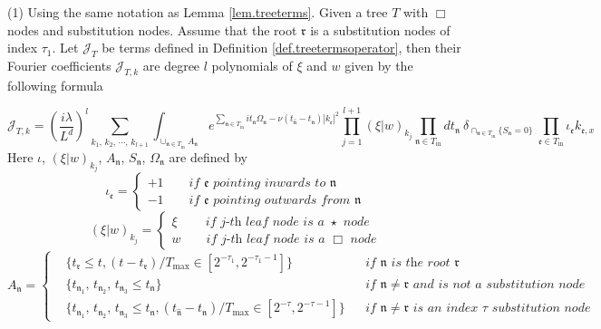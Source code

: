 \begin{lem}\label{lem.treetermsoperator} (1) Using the same notation as Lemma \ref{lem.treeterms}. Given a tree $T$ with $\Box$ nodes and substitution nodes. Assume that the root $\mathfrak{r}$ is a substitution nodes of index $\tau_{1}$. Let $\mathcal{J}_T$ be terms defined in Definition \ref{def.treetermsoperator}, then their Fourier coefficients $\mathcal{J}_{T,k}$ are degree $l$ polynomials of $\xi$ and $w$ given by the following formula

\begin{equation}\label{eq.coeftermoperator.threewave}
\mathcal{J}_{T,k}=\left(\frac{i\lambda}{L^{d}}\right)^l\sum_{k_1,\, k_2,\, \cdots,\, k_{l+1}} \int_{\cup_{\mathfrak{n}\in T_{\text{in}}} A_{\mathfrak{n}}} e^{\sum_{\mathfrak{n}\in T_{\text{in}}} it_{\mathfrak{n}}\Omega_{\mathfrak{n}}-\nu(t_{\widehat{\mathfrak{n}}}-t_{\mathfrak{n}})|k_{\mathfrak{e}}|^2} \prod_{j=1}^{l+1} (\xi|w)_{k_j} %
\prod_{\mathfrak{n}\in T_{\text{in}}} dt_{\mathfrak{n}} 
\ \delta_{\cap_{\mathfrak{n}\in T_{\text{in}}} \{S_{\mathfrak{n}}=0\}}\ \prod_{\mathfrak{e}\in T_{\text{in}}}\iota_{\mathfrak{e}}k_{\mathfrak{e},x}
\end{equation}
Here $\iota$, $(\xi|w)_{k_j}$, $A_{\mathfrak{n}}$, $S_{\mathfrak{n}}$, $\Omega_{\mathfrak{n}}$ are defined by 
\begin{equation}
    \iota_{\mathfrak{e}}=\begin{cases}
        +1 \qquad \textit{if $\mathfrak{e}$ pointing inwards to $\mathfrak{n}$}
        \\
        -1 \qquad  \textit{if $\mathfrak{e}$ pointing outwards from $\mathfrak{n}$}
    \end{cases}
\end{equation}
\begin{equation}
    (\xi|w)_{k_j}=\begin{cases}
        \xi \qquad\  \textit{if $j$-th leaf node is a $\star$ node}
        \\
        w \qquad  \textit{if $j$-th leaf node is a $\Box$ node}
    \end{cases}
\end{equation}
\begin{equation}
    A_{\mathfrak{n}}=\left\{
    \begin{aligned}
        &\{t_{\mathfrak{r}}\le t, (t-t_{\mathfrak{r}})/T_{\text{max}}\in [2^{-\tau_{1}},2^{-\tau_{1}-1}]\} && \textit{if $\mathfrak{n}$ is the root $\mathfrak{r}$ }
        \\
        &\{t_{\mathfrak{n}_1},\, t_{\mathfrak{n}_2},\, t_{\mathfrak{n}_3}\le t_{\mathfrak{n}}\} && \textit{if $\mathfrak{n}\ne \mathfrak{r}$ and is not a substitution node}
        \\
        &\{t_{\mathfrak{n}_1},\, t_{\mathfrak{n}_2},\, t_{\mathfrak{n}_3}\le t_{\mathfrak{n}}, (t_{\widehat{\mathfrak{n}}}-t_{\mathfrak{n}})/T_{\text{max}}\in [2^{-\tau},2^{-\tau-1}]\}  &&\textit{if $\mathfrak{n}\ne \mathfrak{r}$ is an index $\tau$ substitution node}
    \end{aligned}\right.
\end{equation}


\end{lem}
